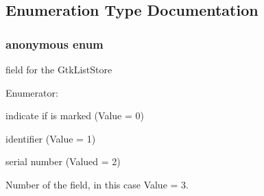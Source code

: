 \subsection{Enumeration Type Documentation}
\hypertarget{usb-gui_8h_a06fc87d81c62e9abb8790b6e5713c55b}{
\subsubsection[{"@0}]{\setlength{\rightskip}{0pt plus 5cm}anonymous enum}}
\label{usb-gui_8h_a06fc87d81c62e9abb8790b6e5713c55b}


field for the GtkListStore 

\begin{Desc}
\item[Enumerator: ]\par
\begin{description}
\item[{\em 
\hypertarget{usb-gui_8h_a06fc87d81c62e9abb8790b6e5713c55ba237841854e4e21628727932d38fdf4c5}{
COLUMN\_\-MARKED}
\label{usb-gui_8h_a06fc87d81c62e9abb8790b6e5713c55ba237841854e4e21628727932d38fdf4c5}
}]indicate if is marked (Value = 0) \item[{\em 
\hypertarget{usb-gui_8h_a06fc87d81c62e9abb8790b6e5713c55bad42963e993a0d76e1a2511cf50b17c79}{
COLUMN\_\-ID}
\label{usb-gui_8h_a06fc87d81c62e9abb8790b6e5713c55bad42963e993a0d76e1a2511cf50b17c79}
}]identifier (Value = 1) \item[{\em 
\hypertarget{usb-gui_8h_a06fc87d81c62e9abb8790b6e5713c55ba0f37881f7ff6971ea31dad00acbd4510}{
COLUMN\_\-SERIAL}
\label{usb-gui_8h_a06fc87d81c62e9abb8790b6e5713c55ba0f37881f7ff6971ea31dad00acbd4510}
}]serial number (Valued = 2) \item[{\em 
\hypertarget{usb-gui_8h_a06fc87d81c62e9abb8790b6e5713c55ba94a1900486855d9c85622e2c106104a9}{
NUM\_\-COLUMNS}
\label{usb-gui_8h_a06fc87d81c62e9abb8790b6e5713c55ba94a1900486855d9c85622e2c106104a9}
}]Number of the field, in this case Value = 3. \end{description}
\end{Desc}



